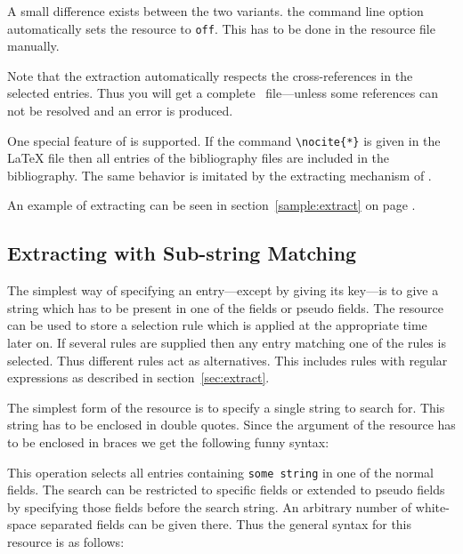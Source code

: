 \documentclass[11pt,a4paper]{scrbook}
\begin{document}
\begin{Resources}
\end{Resources}

A small difference exists between the two variants. the command line option
automatically sets the resource  to \verb|off|. This
has to be done in the resource file manually.

Note that the extraction automatically respects the cross-references in the
selected entries. Thus you will get a complete \BibTeX\ file---unless some
references can not be resolved and an error is produced.

One special feature of \BibTeX{} is supported. If the command
\verb|\nocite{*}| is given in the \LaTeX{} file then all entries of the
bibliography files are included in the bibliography. The same behavior is
imitated by the extracting mechanism of \BibTool.

An example of extracting can be seen in section~\ref{sample:extract} on page
\pageref{sample:extract}.

\subsection{Extracting with Sub-string Matching}

The simplest way of specifying an entry---except by giving its key---is to
give a string which has to be present in one of the fields or pseudo fields.
The resource  can be used to store a selection rule
which is applied at the appropriate time later on. If several rules are
supplied then any entry matching one of the rules is selected. Thus different
rules act as alternatives. This includes rules with regular expressions as
described in section~\ref{sec:extract}.

The simplest form of the resource  is to specify a
single string to search for. This string has to be enclosed in double quotes.
Since the argument of the resource has to be enclosed in braces we get the
following funny syntax:

\begin{Resources}
\end{Resources}

This operation selects all entries containing \texttt{some string} in one of
the normal fields. The search can be restricted to specific fields or extended
to pseudo fields by specifying those fields before the search string. An
arbitrary number of white-space separated fields can be given there. Thus the
general syntax for this resource is as follows:
\end{document}

